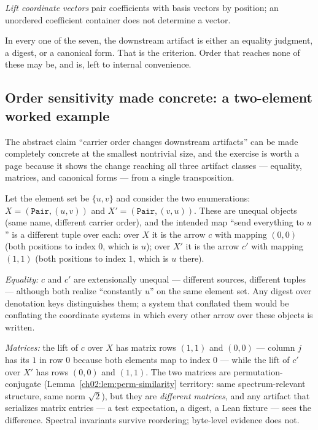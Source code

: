 \emph{Lift coordinate vectors} pair coefficients with basis vectors by
position; an unordered coefficient container does not determine a vector.

In every one of the seven, the downstream artifact is either an equality
judgment, a digest, or a canonical form. That is the criterion. Order that
reaches none of these may be, and is, left to internal convenience.

\subsection{Order sensitivity made concrete: a two-element worked example}

The abstract claim ``carrier order changes downstream artifacts'' can be
made completely concrete at the smallest nontrivial size, and the
exercise is worth a page because it shows the change reaching all three
artifact classes --- equality, matrices, and canonical forms --- from a
single transposition.

Let the element set be $\{u, v\}$ and consider the two enumerations:
$X = (\texttt{Pair}, (u, v))$ and $X' = (\texttt{Pair}, (v, u))$. These
are unequal objects (same name, different carrier order), and the
intended map ``send everything to $u$'' is a different tuple over each:
over $X$ it is the arrow $c$ with mapping $(0, 0)$ (both positions to
index $0$, which is $u$); over $X'$ it is the arrow $c'$ with mapping
$(1, 1)$ (both positions to index $1$, which is $u$ there).

\emph{Equality:} $c$ and $c'$ are extensionally unequal --- different
sources, different tuples --- although both realize ``constantly $u$''
on the same element set. Any digest over denotation keys distinguishes
them; a system that conflated them would be conflating the coordinate
systems in which every other arrow over these objects is written.

\emph{Matrices:} the lift of $c$ over $X$ has matrix rows
$(1, 1)$ and $(0, 0)$ --- column $j$ has its $1$ in row $0$ because
both elements map to index $0$ --- while the lift of $c'$ over $X'$ has
rows $(0, 0)$ and $(1, 1)$. The two matrices are permutation-conjugate
(Lemma~\ref{ch02:lem:perm-similarity} territory: same spectrum-relevant
structure, same norm $\sqrt{2}$), but they are \emph{different matrices},
and any artifact that serializes matrix entries --- a test expectation, a
digest, a Lean fixture --- sees the difference. Spectral invariants
survive reordering; byte-level evidence does not.

